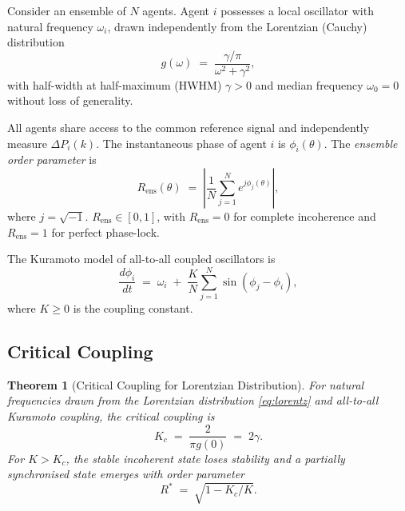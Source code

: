\documentclass[10pt,twocolumn]{article}
\theoremstyle{plain}
\newtheorem{theorem}{Theorem}[section]
\theoremstyle{definition}
\theoremstyle{remark}
\newcommand{\DeltaP}{\Delta P}
\newcommand{\Rens}{R_{\mathrm{ens}}}
\begin{document}
Consider an ensemble of $N$ agents.  Agent $i$ possesses a local
oscillator with natural frequency $\omega_i$, drawn independently from
the Lorentzian (Cauchy) distribution
\begin{equation}
  g(\omega) \;=\; \frac{\gamma/\pi}{\omega^2 + \gamma^2},
  \label{eq:lorentz}
\end{equation}
with half-width at half-maximum (HWHM) $\gamma > 0$ and median
frequency $\omega_0 = 0$ without loss of generality.

All agents share access to the common reference signal and independently
measure $\DeltaP_i(k)$.  The instantaneous phase of agent $i$ is
$\phi_i(\theta)$.  The \emph{ensemble order parameter} is
\begin{equation}
  \Rens(\theta) \;=\; \left|\frac{1}{N}\sum_{j=1}^N
                      e^{j\phi_j(\theta)}\right|,
  \label{eq:orderpar}
\end{equation}
where $j = \sqrt{-1}$.  $\Rens \in [0,1]$, with $\Rens = 0$ for
complete incoherence and $\Rens = 1$ for perfect phase-lock.

The Kuramoto model of all-to-all coupled oscillators
is~\cite{Strogatz2000}
\begin{equation}
  \frac{d\phi_i}{dt} \;=\; \omega_i
    \;+\; \frac{K}{N}\sum_{j=1}^N \sin(\phi_j - \phi_i),
  \label{eq:kuramoto}
\end{equation}
where $K \geq 0$ is the coupling constant.

\subsection{Critical Coupling}
\label{ssec:critical}

\begin{theorem}[Critical Coupling for Lorentzian Distribution]
\label{thm:kc}
For natural frequencies drawn from the Lorentzian distribution
\eqref{eq:lorentz} and all-to-all Kuramoto coupling, the critical
coupling is
\begin{equation}
  K_c \;=\; \frac{2}{\pi g(0)} \;=\; 2\gamma.
  \label{eq:Kc}
\end{equation}
For $K > K_c$, the stable incoherent state loses stability and a
partially synchronised state emerges with order parameter
\begin{equation}
  R^* \;=\; \sqrt{1 - K_c/K}.
  \label{eq:Rstar}
\end{equation}
\end{theorem}
\end{document}
